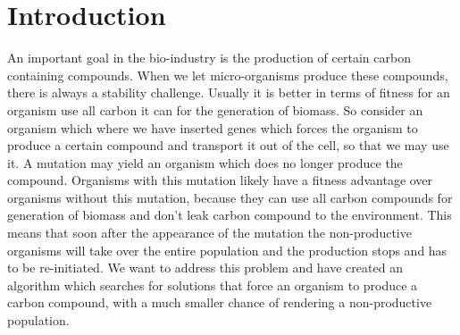 \documentclass[12pt]{report}
\begin{document}
\section{Introduction}
An important goal in the bio-industry is the production of certain carbon containing compounds. When we let micro-organisms produce these compounds, there is always a stability challenge. Usually it is better in terms of fitness for an organism use all carbon it can for the generation of biomass. So consider an organism which where we have inserted genes which forces the organism to produce a certain compound and transport it out of the cell, so that we may use it. A mutation may yield an organism which does no longer produce the compound. Organisms with this mutation likely have a fitness advantage over organisms without this mutation, because they can use all carbon compounds for generation of biomass and don't leak carbon compound to the environment. This means that soon after the appearance of the mutation the non-productive organisms will take over the entire population and the production stops and has to be re-initiated. We want to address this problem and have created an algorithm which searches for solutions that force an organism to produce a carbon compound, with a much smaller chance of rendering a non-productive population.
\end{document}
